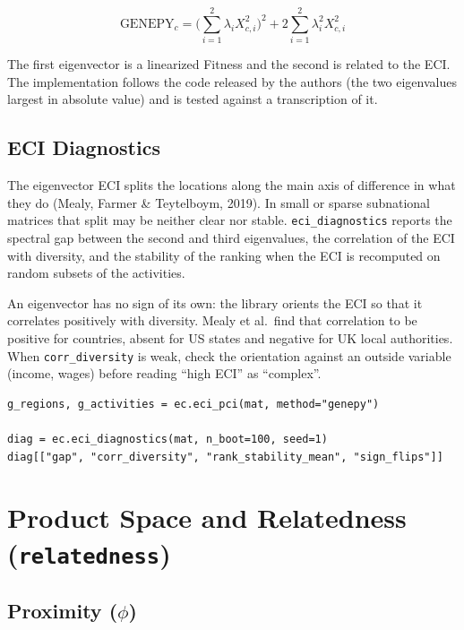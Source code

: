 \documentclass[12pt, a4paper]{article}
\newcommand{\fn}[1]{\texttt{#1}}
\begin{document}
\[
  \text{GENEPY}_c = \Big(\sum_{i=1}^{2} \lambda_i X_{c,i}^2\Big)^{2}
                    + 2 \sum_{i=1}^{2} \lambda_i^{2} X_{c,i}^{2}
\]

The first eigenvector is a linearized Fitness and the second is related
to the ECI. The implementation follows the code released by the authors
(the two eigenvalues largest in absolute value) and is tested against a
transcription of it.

\subsection{ECI Diagnostics}

\begin{sloppypar}
The eigenvector ECI splits the locations along the main axis of
difference in what they do (Mealy, Farmer \& Teytelboym, 2019). In small
or sparse subnational matrices that split may be neither clear nor
stable. \fn{eci\_diagnostics} reports the spectral gap between the
second and third eigenvalues, the correlation of the ECI with diversity,
and the stability of the ranking when the ECI is recomputed on random
subsets of the activities.
\end{sloppypar}

\begin{warnbox}
  An eigenvector has no sign of its own: the library orients the ECI so
  that it correlates positively with diversity. Mealy et al.\ find that
  correlation to be positive for countries, absent for US states and
  negative for UK local authorities. When \texttt{corr\_diversity} is
  weak, check the orientation against an outside variable (income,
  wages) before reading ``high ECI'' as ``complex''.
\end{warnbox}

\begin{lstlisting}[caption={GENEPY and ECI diagnostics}]
g_regions, g_activities = ec.eci_pci(mat, method="genepy")

diag = ec.eci_diagnostics(mat, n_boot=100, seed=1)
diag[["gap", "corr_diversity", "rank_stability_mean", "sign_flips"]]
\end{lstlisting}

\section{Product Space and Relatedness (\texttt{relatedness})}

\subsection{Proximity ($\phi$)}
\end{document}

